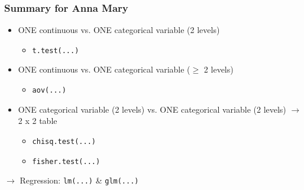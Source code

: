 \documentclass{beamer}\usepackage[]{graphicx}\usepackage[]{color}
\begin{document}
\usebackgroundtemplate{}
\begin{frame}
\frametitle{Summary for Anna Mary}
\begin{itemize}
\setlength\itemsep{1.5em}
\item ONE continuous vs. ONE categorical variable (2 levels)
\begin{itemize}
\item \texttt{t.test(...)}
\end{itemize}
\item ONE continuous vs. ONE categorical variable ($\geq$ 2 levels)
\begin{itemize}
\item \texttt{aov(...)}
\end{itemize}
\item ONE categorical variable (2 levels) vs. ONE categorical variable (2 levels) $\rightarrow$ 2 x 2 table
\begin{itemize}
\item \texttt{chisq.test(...)}
\item \texttt{fisher.test(...)}
\end{itemize}
\end{itemize}
\vspace{0.3em}
\LARGE $\rightarrow$ Regression:  \texttt{lm(...)} \& \texttt{glm(...)}
\end{frame}


\end{document}
